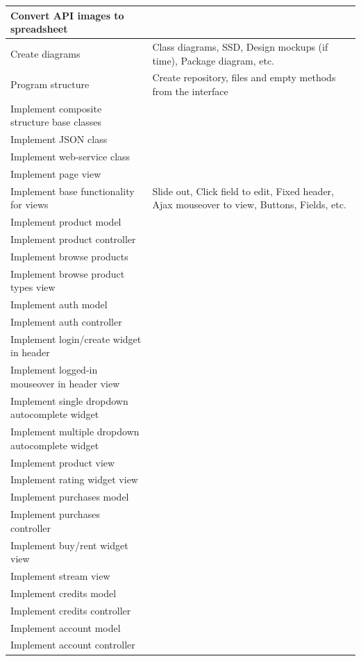 \begin{longtable}{|p{200px}|p{200px}|}
\hline
\endlastfoot
    \hline
	Convert API images to spreadsheet & ~  \\
	\hline
		Create diagrams & Class diagrams, SSD, Design mockups (if time), Package diagram, etc. \\ \hline
	Program structure & Create repository, files and empty methods from the interface \\ \hline
	Implement composite structure base classes & ~ \\ \hline
	Implement JSON class & ~  \\ \hline
	Implement web-service class & ~ \\ \hline
	Implement page view & ~  \\ \hline
	Implement base functionality for views & Slide out, Click field to edit, Fixed header, Ajax mouseover to view, Buttons, Fields,	etc. \\ \hline
	Implement product model & ~  \\ \hline
	Implement product controller & ~  \\ \hline
	Implement browse products & ~  \\ \hline
	Implement browse product types view & ~  \\
	Implement auth model & ~  \\ \hline
	Implement auth controller & ~  \\ \hline
	Implement login/create widget in header & ~  \\ \hline
	Implement logged-in mouseover in header view & ~  \\ \hline	
	Implement single dropdown autocomplete widget & ~  \\ \hline
	Implement multiple dropdown autocomplete widget & ~  \\ \hline
	Implement product view & ~  \\ \hline
	Implement rating widget view & ~  \\ \hline
	Implement purchases model & ~  \\ \hline
	Implement purchases controller & ~  \\ \hline
	Implement buy/rent widget view & ~  \\ \hline
	Implement stream view & ~  \\ \hline
	Implement credits model & ~  \\ \hline
	Implement credits controller & ~  \\ \hline
	Implement account model & ~  \\ \hline
	Implement account controller & ~  \\ \hline

\end{longtable}
